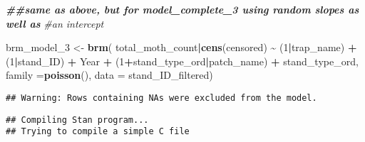 \documentclass[
]{article}
\newenvironment{Shaded}{\begin{snugshade}}{\end{snugshade}}
\newcommand{\AttributeTok}[1]{\textcolor[rgb]{0.13,0.29,0.53}{#1}}
\newcommand{\CommentTok}[1]{\textcolor[rgb]{0.56,0.35,0.01}{\textit{#1}}}
\newcommand{\DecValTok}[1]{\textcolor[rgb]{0.00,0.00,0.81}{#1}}
\newcommand{\DocumentationTok}[1]{\textcolor[rgb]{0.56,0.35,0.01}{\textbf{\textit{#1}}}}
\newcommand{\FunctionTok}[1]{\textcolor[rgb]{0.13,0.29,0.53}{\textbf{#1}}}
\newcommand{\NormalTok}[1]{#1}
\newcommand{\OtherTok}[1]{\textcolor[rgb]{0.56,0.35,0.01}{#1}}
\newcommand{\SpecialCharTok}[1]{\textcolor[rgb]{0.81,0.36,0.00}{\textbf{#1}}}
\begin{document}
\begin{Shaded}
\begin{Highlighting}[]
\DocumentationTok{\#\#same as above, but for \textquotesingle{}model\_complete\_3\textquotesingle{} using random slopes as well as }
\CommentTok{\#an intercept }

\NormalTok{brm\_model\_3 }\OtherTok{\textless{}{-}} \FunctionTok{brm}\NormalTok{(}
\NormalTok{  total\_moth\_count}\SpecialCharTok{|}\FunctionTok{cens}\NormalTok{(censored) }\SpecialCharTok{\textasciitilde{}}\NormalTok{ (}\DecValTok{1}\SpecialCharTok{|}\NormalTok{trap\_name) }
  \SpecialCharTok{+}\NormalTok{ (}\DecValTok{1}\SpecialCharTok{|}\NormalTok{stand\_ID) }\SpecialCharTok{+}\NormalTok{ Year }\SpecialCharTok{+}
\NormalTok{    (}\DecValTok{1}\SpecialCharTok{+}\NormalTok{stand\_type\_ord}\SpecialCharTok{|}\NormalTok{patch\_name) }\SpecialCharTok{+}\NormalTok{ stand\_type\_ord, }
  \AttributeTok{family =}\FunctionTok{poisson}\NormalTok{(), }\AttributeTok{data =}\NormalTok{ stand\_ID\_filtered)}
\end{Highlighting}
\end{Shaded}

\begin{verbatim}
## Warning: Rows containing NAs were excluded from the model.
\end{verbatim}

\begin{verbatim}
## Compiling Stan program...
## Trying to compile a simple C file
\end{verbatim}
\end{document}
